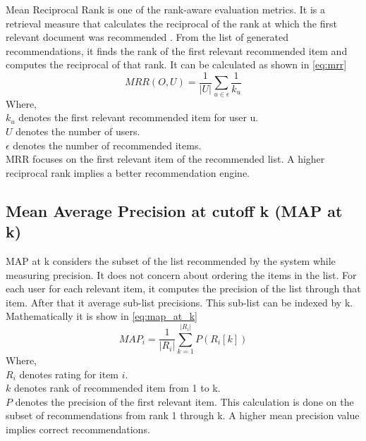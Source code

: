Mean Reciprocal Rank is one of the rank-aware evaluation metrics.
It is a retrieval measure that calculates the reciprocal of the rank at which the first relevant document was recommended \cite{27}.
From the list of generated recommendations, it finds the rank of the first relevant recommended item and computes the reciprocal of that rank. It can be calculated as shown in \autoref{eq:mrr}
\begin{equation}
MRR(O, U) = \frac{1}{\vert U \vert} \sum_{u \in \epsilon} \frac{1} {k_{u}}
\label{eq:mrr}
\end{equation}
\noindent Where, \\
$k_{u}$ denotes the first relevant recommended item for user u. \\
$U$  denotes the number of users. \\
$\epsilon$ denotes the number of recommended items. \\ 
MRR focuses on the first relevant item of the recommended list. A higher reciprocal rank implies a better recommendation engine.


\subsection{Mean Average Precision at cutoff k (MAP at k)}
MAP at k considers the subset of the list recommended by the system while measuring precision. It does not concern about ordering the items in the list. For each user for each relevant item, it computes the precision of the list through that item. After that it average sub-list precisions. This sub-list can be indexed by k. Mathematically it is show in \autoref{eq:map_at_k}
\begin{equation}
MAP_{i} = \frac{1}{\vert R_{i} \vert} \sum_{k=1}^{\vert R_{i} \vert} { P( R_{i}[k]) }
\label{eq:map_at_k}
\end{equation}
\noindent Where, \\
$R_{i}$ denotes rating for item $i$. \\
$k$ denotes rank of recommended item from 1 to k.\\ 
$P$ denotes the precision of the first relevant item.
\noindent This calculation is done on the subset of recommendations from rank 1 through k. A higher mean precision value implies correct recommendations.
